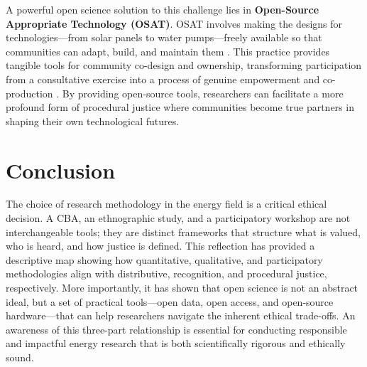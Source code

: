 \documentclass[a4paper, 11pt, twoside]{article}
\begin{document}
A powerful open science solution to this challenge lies in \textbf{Open-Source Appropriate Technology (OSAT)}. OSAT involves making the designs for technologies—from solar panels to water pumps—freely available so that communities can adapt, build, and maintain them \parencite{Pearce2019}. This practice provides tangible tools for community co-design and ownership, transforming participation from a consultative exercise into a process of genuine empowerment and co-production \parencite{Rana2023}. By providing open-source tools, researchers can facilitate a more profound form of procedural justice where communities become true partners in shaping their own technological futures.

\section*{Conclusion}
The choice of research methodology in the energy field is a critical ethical decision. A CBA, an ethnographic study, and a participatory workshop are not interchangeable tools; they are distinct frameworks that structure what is valued, who is heard, and how justice is defined. This reflection has provided a descriptive map showing how quantitative, qualitative, and participatory methodologies align with distributive, recognition, and procedural justice, respectively. More importantly, it has shown that open science is not an abstract ideal, but a set of practical tools—open data, open access, and open-source hardware—that can help researchers navigate the inherent ethical trade-offs. An awareness of this three-part relationship is essential for conducting responsible and impactful energy research that is both scientifically rigorous and ethically sound.

\printbibliography
\end{document}
